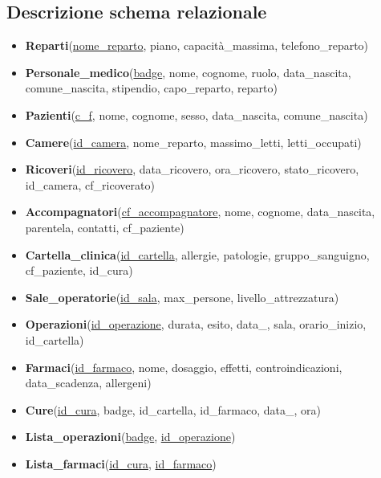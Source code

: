 \documentclass[a4paper, 10pt]{article}
\begin{document}
\subsection{Descrizione schema relazionale}
\begin{spacing}{0.4}
\begin{itemize}
    \item \textbf{Reparti}(\underline{nome\_reparto}, piano, capacità\_massima, telefono\_reparto)
    \item \textbf{Personale\_medico}(\underline{badge}, nome, cognome, ruolo, data\_nascita, comune\_nascita, stipendio, capo\_reparto, reparto)
    \item \textbf{Pazienti}(\underline{c\_f}, nome, cognome, sesso, data\_nascita, comune\_nascita)
    \item \textbf{Camere}(\underline{id\_camera}, nome\_reparto, massimo\_letti, letti\_occupati)
    \item \textbf{Ricoveri}(\underline{id\_ricovero}, data\_ricovero, ora\_ricovero, stato\_ricovero, id\_camera, cf\_ricoverato)
    \item \textbf{Accompagnatori}(\underline{cf\_accompagnatore}, nome, cognome, data\_nascita, parentela, contatti, cf\_paziente)
    \item \textbf{Cartella\_clinica}(\underline{id\_cartella}, allergie, patologie, gruppo\_sanguigno, cf\_paziente, id\_cura)
    \item \textbf{Sale\_operatorie}(\underline{id\_sala}, max\_persone, livello\_attrezzatura)
    \item \textbf{Operazioni}(\underline{id\_operazione}, durata, esito, data\_, sala, orario\_inizio, id\_cartella)
    \item \textbf{Farmaci}(\underline{id\_farmaco}, nome, dosaggio, effetti, controindicazioni, data\_scadenza, allergeni)
    \item \textbf{Cure}(\underline{id\_cura}, badge, id\_cartella, id\_farmaco, data\_, ora)
    \item \textbf{Lista\_operazioni}(\underline{badge}, \underline{id\_operazione})
    \item \textbf{Lista\_farmaci}(\underline{id\_cura}, \underline{id\_farmaco})
\end{itemize}
\end{spacing}
\end{document}
